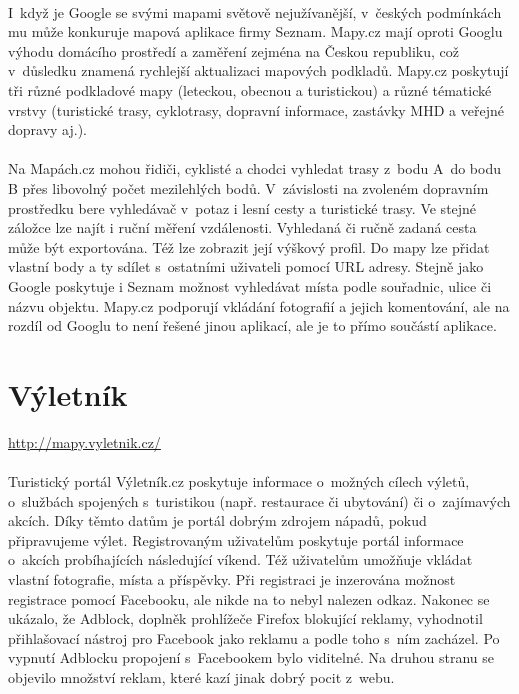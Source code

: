 \documentclass[11pt,a4paper,titlepage,oneside]{book}
\begin{document}
		\paragraph{} I~když je Google se svými mapami světově nejužívanější, v~českých pod\-mínkách mu může konkuruje mapová aplikace firmy Seznam. Mapy.cz mají oproti Googlu výhodu domácího prostředí a zaměření zejména na Českou republiku, což v~důsledku znamená rychlejší aktualizaci mapových podkladů. Mapy.cz poskytují tři různé podkladové mapy (leteckou, obecnou a turistickou) a různé tématické vrstvy (turistické trasy, cyklotrasy, dopravní informace, zastávky MHD a veřejné dopravy aj.). 
		\paragraph{} Na Mapách.cz mohou řidiči, cyklisté a chodci vyhledat trasy z~bodu A~do bodu B přes libovolný počet mezilehlých bodů. V~závislosti na zvoleném dopravním prostředku bere vyhledávač v~potaz i lesní cesty a turistické trasy. Ve stejné záložce lze najít i ruční měření vzdálenosti. Vyhledaná či ručně zadaná cesta může být exportována. Též lze zobrazit její výškový profil. Do mapy lze přidat vlastní body a ty sdílet s~ostatními uživateli pomocí URL adresy. Stejně jako Google poskytuje i Seznam možnost vyhledávat místa podle souřadnic, ulice či názvu objektu. Mapy.cz podporují vkládání fotografií a jejich komentování, ale na rozdíl od Googlu to není řešené jinou aplikací, ale je to přímo součástí aplikace.

	\section{Výletník}
		\label{sec:vyletnik}
		\url{http://mapy.vyletnik.cz/}

		\paragraph{} Turistický portál Výletník.cz poskytuje informace o~možných cílech výletů, o~službách spojených s~turistikou (např. restaurace či ubytování)  či o~zají\-mavých akcích. Díky těmto datům je portál dobrým zdrojem nápadů, pokud připravujeme výlet. Registrovaným uživatelům poskytuje portál informace o~akcích probíhajících následující víkend. Též uživatelům umožňuje vkládat vlastní fotografie, místa a příspěvky. Při registraci je inzerována možnost registrace pomocí Facebooku, ale nikde na to nebyl nalezen odkaz. Nakonec se ukázalo, že Adblock, doplněk prohlížeče Firefox blokující reklamy, vyhodnotil přihlašovací nástroj pro Facebook jako reklamu a podle toho s~ním zacházel. Po vypnutí Adblocku propojení s~Facebookem bylo viditelné. Na druhou stranu se objevilo množství reklam, které kazí jinak dobrý pocit z~webu.
\end{document}
